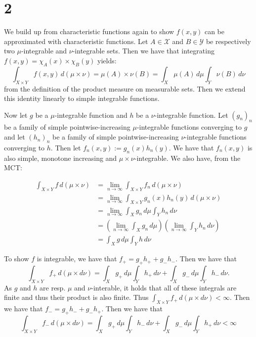 \documentclass{article}
\theoremstyle{definition}
\numberwithin{theorem}{section}
\numberwithin{equation}{section}
\begin{document}
\section{2}
We build up from characteristic functions again to show $f(x, y)$ can be approximated with characteristic functions. Let $A \in \mathcal{X}$ and $B \in \mathcal{Y}$ be respectively two $\mu$-integrable and $\nu$-integrable sets. Then we have that integrating $f(x, y) = \chi_A(x) \times \chi_B(y)$ yields:
\begin{equation}
	\int_{X \times Y} f(x, y) \, d(\mu \times \nu) = \mu(A) \times \nu(B) = \int_X \mu(A) \, d\mu \int_Y \nu(B) \, d\nu
\end{equation}
from the definition of the product measure on measurable sets. Then we extend this identity linearly to simple integrable functions.

Now let $g$ be a $\mu$-integrable function and $h$ be a $\nu$-integrable function. Let $(g_n)_n$ be a family of simple pointwise-increasing $\mu$-integrable functions converging to $g$ and let  $(h_n)_n$ be a family of simple pointwise-increasing $\nu$-integrable functions converging to $h$. Then let $f_n(x, y) := g_n(x) h_n(y)$. We have that $f_n(x, y)$ is also simple, monotone increasing and $\mu \times \nu$-integrable. We also have, from the MCT:

\begin{align*}
	\int_{X \times Y} f \, d(\mu \times \nu) &= \lim_{n \rightarrow \infty} \int_{X \times Y} f_n \, d(\mu \times \nu)\\
	&= \lim_{n \rightarrow \infty} \int_{X \times Y} g_n(x) h_n(y) \, d(\mu \times \nu)\\
	&= \lim_{n \rightarrow \infty} \int_X g_n \, d\mu \int_Y h_n \, d\nu\\
	&= \left(\lim_{n \rightarrow \infty} \int_X g_n \, d\mu\right) \left(\lim_{n \rightarrow \infty}\int_Y h_n \, d\nu\right)\\
	&= \int_X g \, d\mu \int_Y h \, d\nu
\end{align*}

To show $f$ is integrable, we have that $f_+ = g_+ h_+ + g_- h_-$. Then we have that 
\begin{equation}
	\int_{X \times Y} f_+ \, d(\mu \times d\nu) = \int_X g_+ \, d\mu \int_Y h_+ \, d\nu +  \int_X g_- \, d\mu \int_Y h_- \, d\nu.
\end{equation}
As $g$ and $h$ are resp. $\mu$ and $\nu$-interable, it holds that all of these integrals are finite and thus their product is also finite. Thus $\int_{X \times Y} f_+ \, d(\mu \times d\nu) < \infty$. Then we have that $f_- = g_+ h_- + g_- h_+$. Then we have that
\begin{equation}
	\int_{X \times Y} f_- \, d(\mu \times d\nu) = \int_X g_+ \, d\mu \int_Y h_- \, d\nu +  \int_X g_- \, d\mu \int_Y h_+ \, d\nu < \infty
\end{equation}
\end{document}
